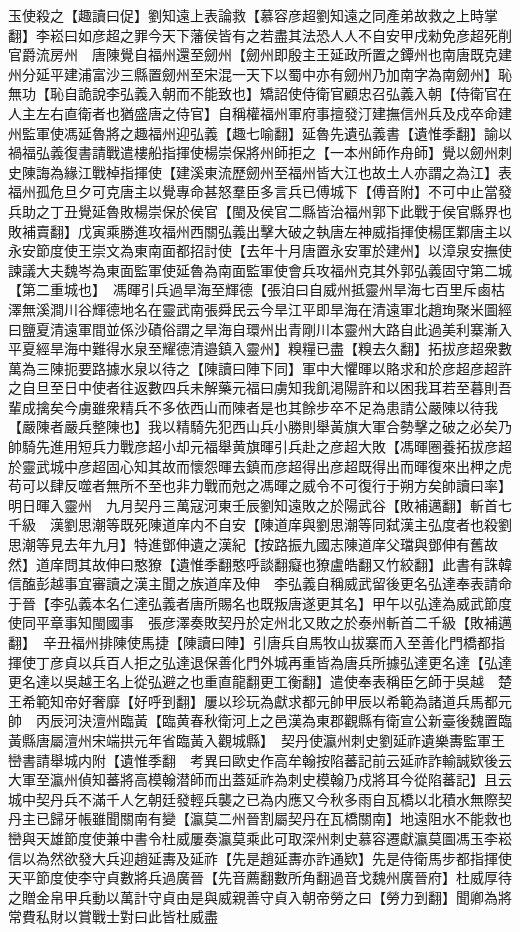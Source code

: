 玉使殺之【趣讀曰促】劉知遠上表論救【慕容彦超劉知遠之同產弟故救之上時掌翻】李崧曰如彦超之罪今天下藩侯皆有之若盡其法恐人人不自安甲戌勑免彦超死削官爵流房州　唐陳覺自福州還至劒州【劒州即殷主王延政所置之鐔州也南唐既克建州分延平建浦富沙三縣置劒州至宋混一天下以蜀中亦有劒州乃加南字為南劒州】恥無功【恥自詭說李弘義入朝而不能致也】矯詔使侍衛官顧忠召弘義入朝【侍衛官在人主左右直衛者也猶盛唐之侍官】自稱權福州軍府事擅發汀建撫信州兵及戍卒命建州監軍使馮延魯將之趣福州迎弘義【趣七喻翻】延魯先遺弘義書【遺惟季翻】諭以禍福弘義復書請戰遣樓船指揮使楊崇保將州師拒之【一本州師作舟師】覺以劒州刺史陳誨為緣江戰棹指揮使【建溪東流歷劒州至福州皆大江也故土人亦謂之為江】表福州孤危旦夕可克唐主以覺專命甚怒羣臣多言兵已傅城下【傅音附】不可中止當發兵助之丁丑覺延魯敗楊崇保於侯官【閩及侯官二縣皆治福州郭下此戰于侯官縣界也敗補賣翻】戊寅乘勝進攻福州西關弘義出擊大破之執唐左神威指揮使楊匡鄴唐主以永安節度使王崇文為東南面都招討使【去年十月唐置永安軍於建州】以漳泉安撫使諫議大夫魏岑為東面監軍使延魯為南面監軍使會兵攻福州克其外郭弘義固守第二城【第二重城也】　馮暉引兵過旱海至輝德【張洎曰自威州抵靈州旱海七百里斥鹵枯澤無溪澗川谷輝德地名在靈武南張舜民云今旱江平即旱海在清遠軍北趙珣聚米圖經曰鹽夏清遠軍間並係沙磧俗謂之旱海自環州出青剛川本靈州大路自此過美利寨漸入平夏經旱海中難得水泉至耀德清邉鎮入靈州】糗糧已盡【糗去久翻】拓拔彦超衆數萬為三陳扼要路據水泉以待之【陳讀曰陣下同】軍中大懼暉以賂求和於彦超彦超許之自旦至日中使者往返數四兵未解藥元福曰虜知我飢渇陽許和以困我耳若至暮則吾輩成擒矣今虜雖衆精兵不多依西山而陳者是也其餘步卒不足為患請公嚴陳以待我【嚴陳者嚴兵整陳也】我以精騎先犯西山兵小勝則舉黃旗大軍合勢擊之破之必矣乃帥騎先進用短兵力戰彦超小却元福舉黄旗暉引兵赴之彦超大敗【馮暉圈養拓拔彦超於靈武城中彦超固心知其故而懷怨暉去鎮而彦超得出彦超既得出而暉復來出柙之虎苟可以肆反噬者無所不至也非力戰而尅之馮暉之威令不可復行于朔方矣帥讀曰率】明日暉入靈州　九月契丹三萬寇河東壬辰劉知遠敗之於陽武谷【敗補邁翻】斬首七千級　漢劉思潮等既死陳道庠内不自安【陳道庠與劉思潮等同弑漢主弘度者也殺劉思潮等見去年九月】特進鄧伸遺之漢紀【按路振九國志陳道庠父璫與鄧伸有舊故然】道庠問其故伸曰憨獠【遺惟季翻憨呼談翻癡也獠盧皓翻又竹絞翻】此書有誅韓信醢彭越事宜審讀之漢主聞之族道庠及伸　李弘義自稱威武留後更名弘達奉表請命于晉【李弘義本名仁達弘義者唐所賜名也既叛唐遂更其名】甲午以弘達為威武節度使同平章事知閩國事　張彦澤奏敗契丹於定州北又敗之於泰州斬首二千級【敗補邁翻】　辛丑福州排陳使馬捷【陳讀曰陣】引唐兵自馬牧山拔寨而入至善化門橋都指揮使丁彦貞以兵百人拒之弘達退保善化門外城再重皆為唐兵所據弘達更名達【弘達更名達以吳越王名上從弘避之也重直龍翻更工衡翻】遣使奉表稱臣乞師于吳越　楚王希範知帝好奢靡【好呼到翻】屢以珍玩為獻求都元帥甲辰以希範為諸道兵馬都元帥　丙辰河決澶州臨黃【臨黄春秋衛河上之邑漢為東郡觀縣有衛宣公新臺後魏置臨黃縣唐屬澶州宋端拱元年省臨黃入觀城縣】　契丹使瀛州刺史劉延祚遺樂夀監軍王巒書請舉城内附【遺惟季翻　考異曰歐史作高牟翰按陷蕃記前云延祚詐輸誠欵後云大軍至瀛州偵知蕃將高模翰潜師而出蓋延祚為刺史模翰乃戍將耳今從陷蕃記】且云城中契丹兵不滿千人乞朝廷發輕兵襲之已為内應又今秋多雨自瓦橋以北積水無際契丹主已歸牙帳雖聞關南有變【瀛莫二州晉割屬契丹在瓦橋關南】地遠阻水不能救也巒與天雄節度使兼中書令杜威屢奏瀛莫乘此可取深州刺史慕容遷獻瀛莫圖馮玉李崧信以為然欲發大兵迎趙延夀及延祚【先是趙延夀亦詐通欵】先是侍衛馬步都指揮使天平節度使李守貞數將兵過廣晉【先音薦翻數所角翻過音戈魏州廣晉府】杜威厚待之贈金帛甲兵動以萬計守貞由是與威親善守貞入朝帝勞之曰【勞力到翻】聞卿為將常費私財以賞戰士對曰此皆杜威盡
